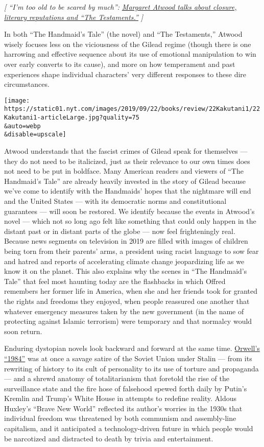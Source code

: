 \emph{{[} ``I'm too old to be scared by much'':}
\href{https://www.nytimes.com/2019/09/05/books/handmaids-tale-sequel-testaments-margaret-atwood.html}{\emph{Margaret
Atwood talks about closure, literary reputations and ``The
Testaments.''}} \emph{{]}}

In both ``The Handmaid's Tale'' (the novel) and ``The Testaments,''
Atwood wisely focuses less on the viciousness of the Gilead regime
(though there is one harrowing and effective sequence about its use of
emotional manipulation to win over early converts to its cause), and
more on how temperament and past experiences shape individual
characters' very different responses to these dire circumstances.

\texttt{[image: https://static01.nyt.com/images/2019/09/22/books/review/22Kakutani1/22Kakutani1-articleLarge.jpg?quality=75\\\&auto=webp\\\&disable=upscale]}

Atwood understands that the fascist crimes of Gilead speak for
themselves --- they do not need to be italicized, just as their
relevance to our own times does not need to be put in boldface. Many
American readers and viewers of ``The Handmaid's Tale'' are already
heavily invested in the story of Gilead because we've come to identify
with the Handmaids' hopes that the nightmare will end and the United
States --- with its democratic norms and constitutional guarantees ---
will soon be restored. We identify because the events in Atwood's novel
--- which not so long ago felt like something that could only happen in
the distant past or in distant parts of the globe --- now feel
frighteningly real. Because news segments on television in 2019 are
filled with images of children being torn from their parents' arms, a
president using racist language to sow fear and hatred and reports of
accelerating climate change jeopardizing life as we know it on the
planet. This also explains why the scenes in ``The Handmaid's Tale''
that feel most haunting today are the flashbacks in which Offred
remembers her former life in America, when she and her friends took for
granted the rights and freedoms they enjoyed, when people reassured one
another that whatever emergency measures taken by the new government (in
the name of protecting against Islamic terrorism) were temporary and
that normalcy would soon return.

Enduring dystopian novels look backward and forward at the same time.
\href{https://www.nytimes.com/2017/01/26/books/why-1984-is-a-2017-must-read.html}{Orwell's
``1984''} was at once a savage satire of the Soviet Union under Stalin
--- from its rewriting of history to its cult of personality to its use
of torture and propaganda --- and a shrewd anatomy of totalitarianism
that foretold the rise of the surveillance state and the fire hose of
falsehood spewed forth daily by Putin's Kremlin and Trump's White House
in attempts to redefine reality. Aldous Huxley's ``Brave New World''
reflected its author's worries in the 1930s that individual freedom was
threatened by both communism and assembly-line capitalism, and it
anticipated a technology-driven future in which people would be
narcotized and distracted to death by trivia and entertainment.

